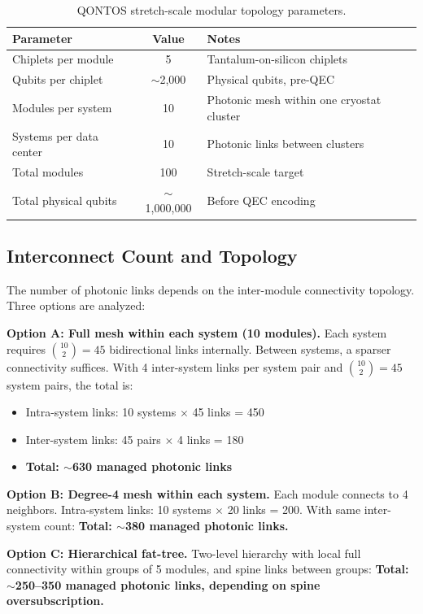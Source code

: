 \documentclass[conference]{IEEEtran}
\begin{document}
\begin{table}[H]
\centering
\caption{QONTOS stretch-scale modular topology parameters.}
\label{tab:topology}
\footnotesize
\begin{tabularx}{\columnwidth}{L{3.0cm}cL{3.0cm}}
\toprule
\textbf{Parameter} & \textbf{Value} & \textbf{Notes} \\
\midrule
Chiplets per module & 5 & Tantalum-on-silicon chiplets \\
Qubits per chiplet & $\sim$2,000 & Physical qubits, pre-QEC \\
Modules per system & 10 & Photonic mesh within one cryostat cluster \\
Systems per data center & 10 & Photonic links between clusters \\
Total modules & 100 & Stretch-scale target \\
Total physical qubits & $\sim$1,000,000 & Before QEC encoding \\
\bottomrule
\end{tabularx}
\end{table}

\subsection{Interconnect Count and Topology}

The number of photonic links depends on the inter-module connectivity topology. Three options are analyzed:

\textbf{Option A: Full mesh within each system (10 modules).} Each system requires $\binom{10}{2} = 45$ bidirectional links internally. Between systems, a sparser connectivity suffices. With 4 inter-system links per system pair and $\binom{10}{2} = 45$ system pairs, the total is:
\begin{itemize}
\item Intra-system links: 10 systems $\times$ 45 links = 450
\item Inter-system links: 45 pairs $\times$ 4 links = 180
\item \textbf{Total: $\sim$630 managed photonic links}
\end{itemize}

\textbf{Option B: Degree-4 mesh within each system.} Each module connects to 4 neighbors. Intra-system links: 10 systems $\times$ 20 links = 200. With same inter-system count: \textbf{Total: $\sim$380 managed photonic links.}

\textbf{Option C: Hierarchical fat-tree.} Two-level hierarchy with local full connectivity within groups of 5 modules, and spine links between groups: \textbf{Total: $\sim$250--350 managed photonic links, depending on spine oversubscription.}
\end{document}
